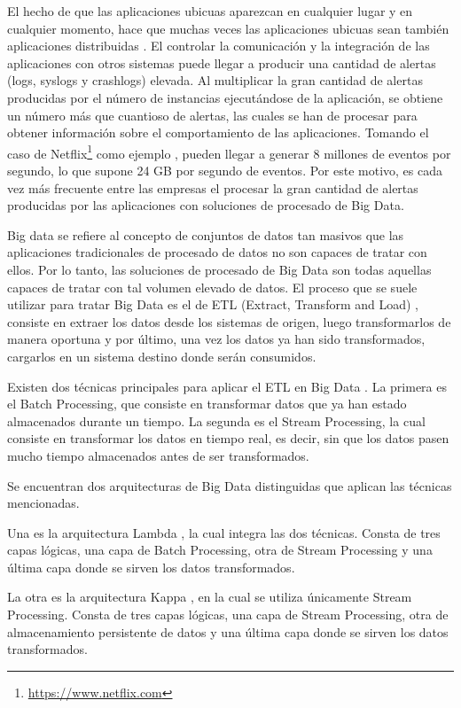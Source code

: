 El hecho de que las aplicaciones ubicuas aparezcan en cualquier lugar y en cualquier momento, hace que muchas veces las aplicaciones ubicuas sean también aplicaciones distribuidas \cite{Tfg:distributedapp}. El controlar la comunicación y la integración de las aplicaciones con otros sistemas puede llegar a producir una cantidad de alertas (logs, syslogs y crashlogs) elevada. Al multiplicar la gran cantidad de alertas producidas por el número de instancias ejecutándose de la aplicación, se obtiene un número más que cuantioso de alertas, las cuales se han de procesar para obtener información sobre el comportamiento de las aplicaciones. Tomando el caso de Netflix\footnote{\href{https://www.netflix.com}{https://www.netflix.com}} como ejemplo \cite{Tfg:netflixpipe}, pueden llegar a generar 8 millones de eventos por segundo, lo que supone 24 GB por segundo de eventos. Por este motivo, es cada vez más frecuente entre las empresas el procesar la gran cantidad de alertas producidas por las aplicaciones con soluciones de procesado de Big Data.

Big data \cite{Tfg:bigdata} se refiere al concepto de conjuntos de datos tan masivos que las aplicaciones tradicionales de procesado de datos no son capaces de tratar con ellos. Por lo tanto, las soluciones de procesado de Big Data son todas aquellas capaces de tratar con tal volumen elevado de datos. El proceso que se suele utilizar para tratar Big Data es el de ETL (Extract, Transform and Load) \cite{Tfg:etl}, consiste en extraer los datos desde los sistemas de origen, luego transformarlos de manera oportuna y por último, una vez los datos ya han sido transformados, cargarlos en un sistema destino donde serán consumidos. 

Existen dos técnicas principales para aplicar el ETL en Big Data \cite{Tfg:batchstream}. La primera es el Batch Processing, que consiste en transformar datos que ya han estado almacenados durante un tiempo. La segunda es el Stream Processing, la cual consiste en transformar los datos en tiempo real, es decir, sin que los datos pasen mucho tiempo almacenados antes de ser transformados. 

Se encuentran dos arquitecturas de Big Data distinguidas que aplican las técnicas mencionadas. 

Una es la arquitectura Lambda \cite{Tfg:lambda}, la cual integra las dos técnicas. Consta de tres capas lógicas, una capa de Batch Processing, otra de Stream Processing y una última capa donde se sirven los datos transformados.

La otra es la arquitectura Kappa \cite{Tfg:kappa}, en la cual se utiliza únicamente Stream Processing. Consta de tres capas lógicas, una capa de Stream Processing, otra de almacenamiento persistente de datos y una última capa donde se sirven los datos transformados.


